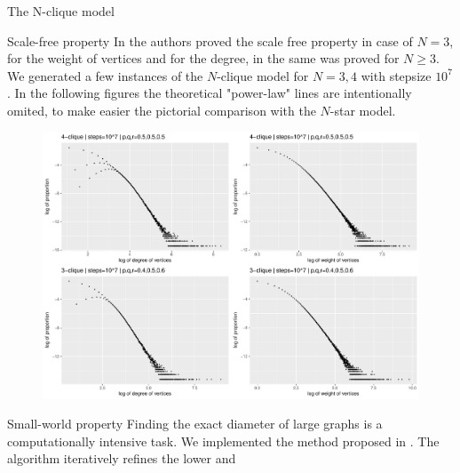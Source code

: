 \documentclass[final]{beamer}
\newlength{\onecolwid}
\newlength{\twocolwid}
\begin{document}
\begin{frame}[t]
\begin{columns}[t]
\begin{column}{\twocolwid}
\begin{columns}[t,totalwidth=\twocolwid]
\begin{column}{\onecolwid}
\begin{block}{The N-clique model}
\end{block}

\begin{block}{Scale-free property}\small
In \cite{BaMo} the authors proved the scale free property in case of $N=3$, for 
the weight of vertices and for the degree, in \cite{FaPo} the same was proved for 
$N\ge 3.$ We generated a few instances of the $N$-clique model for $N=3,4$ with stepsize 
$10^7$. In the following figures the theoretical "power-law" lines are intentionally omited, 
to make easier the pictorial comparison with the $N$-star model.
\vskip 2cm
\begin{figure}
\includegraphics[width=0.8\linewidth]{./fig/klikkdist4v.pdf}
\end{figure}
\end{block}

\begin{block}{Small-world property}\small
Finding the exact diameter of large graphs is a computationally intensive task. 
We implemented the method proposed in \cite{CreMa}. The algorithm iteratively 
refines the lower and
\end{block}

\end{column} %


\end{columns}
\end{column}
\end{columns}
\end{frame}
\end{document}

